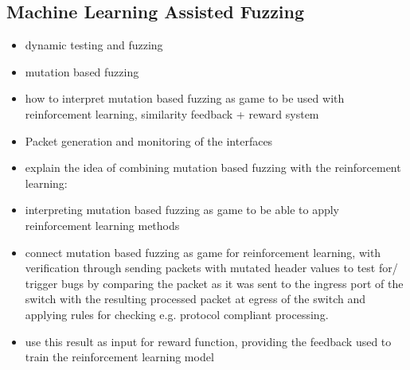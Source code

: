 \subsection{Machine Learning Assisted Fuzzing}


\begin{itemize}
    \item dynamic testing and fuzzing
    \item mutation based fuzzing
    \item how to interpret mutation based fuzzing as game to be used with reinforcement learning, similarity feedback + reward system
    \item Packet generation and monitoring of the interfaces
\end{itemize}

\begin{itemize}
    \item explain the idea of combining mutation based fuzzing with the reinforcement learning:
    \item interpreting mutation based fuzzing as game to be able to apply reinforcement learning methods
    \item connect mutation based fuzzing as game for reinforcement learning, with verification through sending packets with mutated header values to test for/ trigger bugs by comparing the packet as it was sent to the ingress port of the switch with the resulting processed packet at egress of the switch and applying rules for checking e.g. protocol compliant processing.
    \item use this result as input for reward function, providing the feedback used to train the reinforcement learning model
\end{itemize}